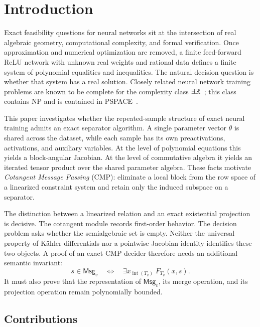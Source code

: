 \section{Introduction}
\label{sec:introduction}

Exact feasibility questions for neural networks sit at the intersection of
real algebraic geometry, computational complexity, and formal verification.
Once approximation and numerical optimization are removed, a finite
feed-forward ReLU network with unknown real weights and rational data defines a
finite system of polynomial equalities and inequalities.  The natural decision
question is whether that system has a real solution.  Closely related neural
network training problems are known to be complete for the complexity class
\(\exists\mathbb{R}\)~\cite{AbrahamsenKleistMiltzow2021}; this class contains NP and is
contained in PSPACE~\cite{Canny1988,SchaeferCardinalMiltzow2024}.

This paper investigates whether the repeated-sample structure of exact neural
training admits an exact separator algorithm.  A single parameter vector
\(\theta\) is shared across the dataset, while each sample has its own
preactivations, activations, and auxiliary variables.  At the level of
polynomial equations this yields a block-angular Jacobian.  At the level of
commutative algebra it yields an iterated tensor product over the shared
parameter algebra.  These facts motivate \emph{Cotangent Message Passing}
(CMP): eliminate a local block from the row space of a linearized constraint
system and retain only the induced subspace on a separator.

The distinction between a linearized relation and an exact existential
projection is decisive.  The cotangent module records first-order behavior.
The decision problem asks whether the semialgebraic set is empty.  Neither the
universal property of K\"ahler differentials nor a pointwise Jacobian identity
identifies these two objects.  A proof of an exact CMP decider therefore needs
an additional semantic invariant:
\begin{equation}
  s\in \mathsf{Msg}_v
  \quad\Longleftrightarrow\quad
  \exists x_{\operatorname{int}(T_v)}\;
  F_{T_v}(x,s).
  \label{eq:semantic-message-intro}
\end{equation}
It must also prove that the representation of \(\mathsf{Msg}_v\), its merge
operation, and its projection operation remain polynomially bounded.

\subsection{Contributions}

